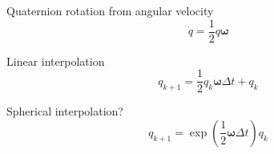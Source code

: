 \documentclass[lettersize,journal]{IEEEtran}
\begin{document}
Quaternion rotation from angular velocity
\begin{equation}
  \dot{q} = \frac{1}{2} q\boldsymbol\omega
  \end{equation}

Linear interpolation
\begin{equation}
  q_{k+1} = \frac{1}{2}q_k\boldsymbol\omega\Delta t + q_k 
\end{equation}

Spherical interpolation?
\begin{equation}
  q_{k+1} = \exp\left(\frac{1}{2} \boldsymbol\omega\Delta t\right)q_k
\end{equation}






% 





\end{document}
